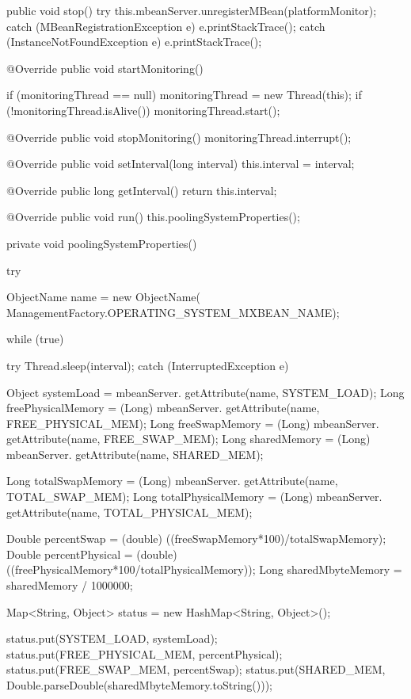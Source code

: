 \begin{verbatimtab}[4]
{	public void stop() {
		try {
			this.mbeanServer.unregisterMBean(platformMonitor);
		} catch (MBeanRegistrationException e) {
			e.printStackTrace();
		} catch (InstanceNotFoundException e) {
			e.printStackTrace();
		}
	}

	@Override
	public void startMonitoring() {

		if (monitoringThread == null) {
			monitoringThread = new Thread(this);
		}
		if (!monitoringThread.isAlive()) {
			monitoringThread.start();
		}
	}

	@Override
	public void stopMonitoring() {
		monitoringThread.interrupt();
	}

	@Override
	public void setInterval(long interval) {
		this.interval = interval;
	}

	@Override
	public long getInterval() {
		return this.interval;
	}

	@Override
	public void run() {
		this.poolingSystemProperties();
	}

	private void poolingSystemProperties() {
		try {
			ObjectName name = new ObjectName(
					ManagementFactory.OPERATING_SYSTEM_MXBEAN_NAME);

			while (true) {

				try {
					Thread.sleep(interval);
				} catch (InterruptedException e) {
				}

				Object systemLoad = mbeanServer.
					getAttribute(name, SYSTEM_LOAD);
				Long freePhysicalMemory = (Long) mbeanServer.
					getAttribute(name, FREE_PHYSICAL_MEM);
				Long freeSwapMemory = (Long) mbeanServer.
					getAttribute(name, FREE_SWAP_MEM);
				Long sharedMemory = (Long) mbeanServer.
					getAttribute(name, SHARED_MEM);

				Long totalSwapMemory = (Long) mbeanServer.
					getAttribute(name, TOTAL_SWAP_MEM);
				Long totalPhysicalMemory = (Long) mbeanServer.
					getAttribute(name, TOTAL_PHYSICAL_MEM);
				
				
				Double percentSwap = (double) 
					((freeSwapMemory*100)/totalSwapMemory);
				Double percentPhysical = (double) 
					((freePhysicalMemory*100/totalPhysicalMemory));
				Long sharedMbyteMemory = sharedMemory / 1000000;
				
				Map<String, Object> status = new HashMap<String, Object>();
				
				status.put(SYSTEM_LOAD, systemLoad);
				status.put(FREE_PHYSICAL_MEM, percentPhysical);
				status.put(FREE_SWAP_MEM, percentSwap);
				status.put(SHARED_MEM,
						Double.parseDouble(sharedMbyteMemory.toString()));

}}}}
\end{verbatimtab}
